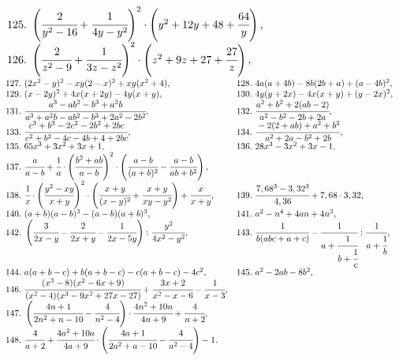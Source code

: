 \documentclass[12pt]{article}
\begin{document}
$\begin{array}{ll}
125.\ \left(\cfrac{2}{y^2-16}+\cfrac{1}{4y-y^2}\right)^2\cdot\left(y^2+12y+48+\cfrac{64}{y}\right),\\
126.\ \left(\cfrac{2}{z^2-9}+\cfrac{1}{3z-z^2}\right)^2\cdot\left(z^2+9z+27+\cfrac{27}{z}\right),
\end{array}$\\
$\begin{array}{ll}
127.\ (2x^2-y)^2-xy(2-x)^2+xy(x^2+4), &
128.\ 4a(a+4b)-8b(2b+a)+(a-4b)^2,\\
129.\ (x-2y)^2+4x(x+2y)-4y(x+y), &
130.\ 4y(y+2x)-4x(x+y)+(y-2x)^2,\\
131.\ \cfrac{a^3-ab^2-b^3+a^2b}{a^3+a^2b-ab^2-b^3+2a^2-2b^2}, &
132.\ \cfrac{a^2+b^2+2(ab-2)}{a^2-b^2-2b+2a},\\
133.\ \cfrac{c^3+b^3-2c^2-2b^2+2bc}{c^2+b^2-4c-4b+4+2bc},&
134.\ \cfrac{-2(2+ab)+a^2+b^2}{a^2+2a-b^2+2b},\\
135.\ 65x^3+3x^2+3x+1,&
136.\ 28x^3-3x^2+3x-1,\\
137.\ \cfrac{a}{a-b}+\cfrac{1}{a}\cdot\left(\cfrac{b^2+ab}{a-b}\right)^2\cdot\left(\cfrac{a-b}{(a+b)^2}-\cfrac{a-b}{ab+b^2}\right),\\
138.\ \cfrac{1}{x}\cdot\left(\cfrac{y^2-xy}{x+y}\right)^2\cdot\left(\cfrac{x+y}{(x-y)^2}+\cfrac{x+y}{xy-y^2}\right)+\cfrac{x}{x+y},&
139.\ \cfrac{7,68^3-3,32^3}{4,36}+7,68\cdot3,32,\\
140.\ (a+b)(a-b)^3-(a-b)(a+b)^3, &
141.\ a^2-n^4+4an+4n^3,\\
142.\ \left(\cfrac{3}{2x-y}-\cfrac{2}{2x+y}-\cfrac{1}{2x-5y}\right):\cfrac{y^2}{4x^2-y^2},&
143.\ \cfrac{1}{b(abc+a+c)}-\cfrac{1}{a+\cfrac{1}{b+\cfrac{1}{c}}}:\cfrac{1}{a+\cfrac{1}{b}},\\
144.\ a(a+b-c)+b(a+b-c)-c(a+b-c)-4c^2, & 145.\ a^2-2ab-8b^2,\\
146.\ \cfrac{(x^3-8)(x^2-6x+9)}{(x^2-4)(x^3-9x^2+27x-27)}+\cfrac{3x+2}{x^2-x-6}-\cfrac{1}{x-3},\\
147.\ \left(\cfrac{4n+1}{2n^2+n-10}-\cfrac{4}{n^2-4}\right)\cdot\cfrac{4n^2+10n}{4n+9}+\cfrac{4}{n+2},\\
148.\ \cfrac{4}{a+2}+\cfrac{4a^2+10a}{4a+9}\cdot\left(\cfrac{4a+1}{2a^2+a-10}-\cfrac{4}{a^2-4}\right)-1.
\end{array}$
\newpage
\end{document}
